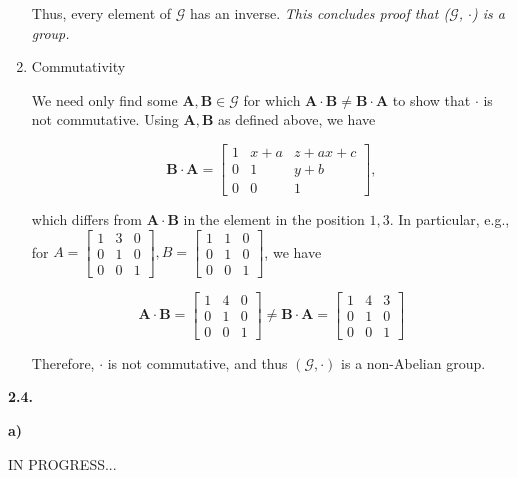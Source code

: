 \documentclass{article}
\def\ma{{\bm{A}}}
\def\mb{{\bm{B}}}
\begin{document}
\begin{enumerate}
    Thus, every element of $\mathcal{G}$ has an inverse. \textit{This concludes proof that ($\mathcal{G}$, $\cdot$) is a group.}
    
    \item Commutativity
    
    We need only find some $\ma, \mb \in \mathcal{G}$ for which $\ma \cdot \mb \neq \mb \cdot \ma$ to show that $\cdot$ is not commutative. Using $\ma, \mb$ as defined above, we have
    
    \[
    \mb \cdot \ma = \begin{bmatrix}
        1 & x + a & z + ax + c\\
        0 & 1 & y + b\\
        0 & 0 & 1
    \end{bmatrix},
    \]
    
    which differs from $\ma \cdot \mb$ in the element in the position $1, 3$. In particular, e.g., for $A = \begin{bmatrix}
        1 & 3 & 0\\
        0 & 1 & 0\\
        0 & 0 & 1
    \end{bmatrix}, B = \begin{bmatrix}
        1 & 1 & 0\\
        0 & 1 & 0\\
        0 & 0 & 1
    \end{bmatrix}$, we have
    
    \[
    \ma \cdot \mb = \begin{bmatrix}
        1 & 4 & 0\\
        0 & 1 & 0\\
        0 & 0 & 1
    \end{bmatrix} \neq \mb \cdot \ma = \begin{bmatrix}
        1 & 4 & 3\\
        0 & 1 & 0\\
        0 & 0 & 1
    \end{bmatrix}
    \]
    
    Therefore, $\cdot$ is not commutative, and thus $(\mathcal{G}, \cdot)$ is a non-Abelian group.
\end{enumerate}

\textbf{2.4.}

\textbf{a)}

IN PROGRESS...
\end{document}
